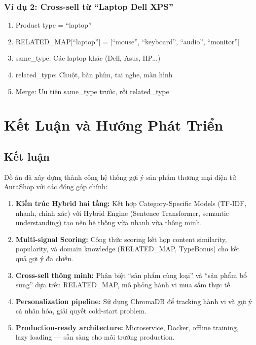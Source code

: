 \documentclass[12pt,a4paper]{report}
\begin{document}
\subsection{Ví dụ 2: Cross-sell từ ``Laptop Dell XPS''}

\begin{enumerate}
    \item Product type = ``laptop''
    \item RELATED\_MAP[``laptop''] = [``mouse'', ``keyboard'', ``audio'', ``monitor'']
    \item same\_type: Các laptop khác (Dell, Asus, HP...)
    \item related\_type: Chuột, bàn phím, tai nghe, màn hình
    \item Merge: Ưu tiên same\_type trước, rồi related\_type
\end{enumerate}

\chapter{Kết Luận và Hướng Phát Triển}

\section{Kết luận}

Đồ án đã xây dựng thành công hệ thống gợi ý sản phẩm thương mại điện tử AuraShop với các đóng góp chính:

\begin{enumerate}
    \item \textbf{Kiến trúc Hybrid hai tầng:} Kết hợp Category-Specific Models (TF-IDF, nhanh, chính xác) với Hybrid Engine (Sentence Transformer, semantic understanding) tạo nên hệ thống vừa nhanh vừa thông minh.
    
    \item \textbf{Multi-signal Scoring:} Công thức scoring kết hợp content similarity, popularity, và domain knowledge (RELATED\_MAP, TypeBonus) cho kết quả gợi ý đa chiều.
    
    \item \textbf{Cross-sell thông minh:} Phân biệt ``sản phẩm cùng loại'' và ``sản phẩm bổ sung'' dựa trên RELATED\_MAP, mô phỏng hành vi mua sắm thực tế.
    
    \item \textbf{Personalization pipeline:} Sử dụng ChromaDB để tracking hành vi và gợi ý cá nhân hóa, giải quyết cold-start problem.
    
    \item \textbf{Production-ready architecture:} Microservice, Docker, offline training, lazy loading — sẵn sàng cho môi trường production.
\end{enumerate}
\end{document}
